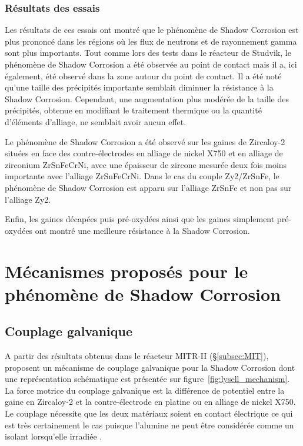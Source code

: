\begin{refsection}
	
	\subsubsection{Résultats des essais}
        Les résultats de ces essais ont montré que le phénomène de Shadow Corrosion est
        plus prononcé dans les régions où les flux de neutrons et de rayonnement
        gamma sont plus importants. Tout comme lors des tests dans le réacteur de Studvik, 
        le phénomène de Shadow Corrosion a été
        observée au point de contact mais il a, ici également, été observé dans la zone autour du point de contact.
        Il a été noté qu'une taille des précipités importante semblait diminuer
        la résistance à la Shadow Corrosion. Cependant, une augmentation plus
        modérée de la taille des précipités, obtenue en modifiant le traitement thermique ou la quantité
        d’éléments d’alliage, ne semblait avoir aucun effet.
	
        Le phénomène de Shadow Corrosion a été observé sur les gaines de Zircaloy-2 situées
        en face des contre-électrodes en alliage de nickel X750 et en alliage de
        zirconium ZrSnFeCrNi, avec une épaisseur de zircone mesurée deux fois moins
        importante avec l’alliage ZrSnFeCrNi. Dans le cas du couple Zy2/ZrSnFe,
        le phénomène de Shadow Corrosion est apparu sur l'alliage ZrSnFe et non pas sur l'alliage Zy2.

        Enfin, les gaines décapées puis pré-oxydées ainsi que les gaines simplement pré-oxydées
        ont montré une meilleure résistance à la Shadow Corrosion.


\section{Mécanismes proposés pour le phénomène de Shadow Corrosion}\label{sec:mechanisms}


    \subsection{Couplage galvanique}\label{subsec:galvanic_coupling}
    A partir des résultats obtenus dans le réacteur MITR-II (\S\ref{subsec:MIT}), \citet{Lysell2004} proposent un 
    mécanisme de couplage galvanique pour la Shadow Corrosion dont une représentation schématique est présentée 
    sur figure~\ref{fig:lysell_mechanism}. La force motrice du couplage galvanique est la différence de potentiel 
    entre la gaine en Zircaloy-2 et la contre-électrode en platine ou en alliage de nickel X750. 
    Le couplage nécessite que les deux matériaux soient en contact électrique ce qui est très certainement le cas puisque 
    l’alumine ne peut être considérée comme un isolant lorsqu’elle irradiée \citep{Shikama1994}. 


\end{refsection}
